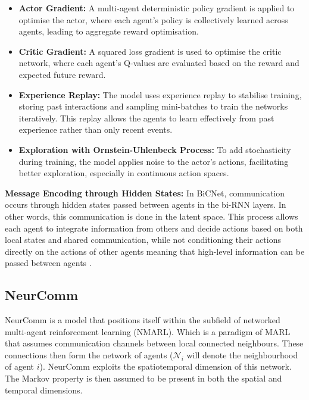 \documentclass{article}
\begin{document}
\begin{itemize}
    \item \textbf{Actor Gradient:} A multi-agent deterministic policy gradient is applied to optimise the actor, where each agent’s policy is collectively learned across agents, leading to aggregate reward optimisation.
    
    \item \textbf{Critic Gradient:} A squared loss gradient is used to optimise the critic network, where each agent’s Q-values are evaluated based on the reward and expected future reward.
    
    \item \textbf{Experience Replay:} The model uses experience replay to stabilise training, storing past interactions and sampling mini-batches to train the networks iteratively. This replay allows the agents to learn effectively from past experience rather than only recent events.
    
    \item \textbf{Exploration with Ornstein-Uhlenbeck Process:} To add stochasticity during training, the model applies noise to the actor's actions, facilitating better exploration, especially in continuous action spaces.
\end{itemize}

\textbf{Message Encoding through Hidden States:} In BiCNet, communication occurs through hidden states passed between agents in the bi-RNN layers. In other words, this communication is done in the latent space. This process allows each agent to integrate information from others and decide actions based on both local states and shared communication, while not conditioning their actions directly on the actions of other agents meaning that high-level information can be passed between agents \citep{peng2017bicnet}.

\subsection{NeurComm}

NeurComm \citep{chu2020NeurComm} is a model that positions itself within the subfield of networked multi-agent reinforcement learning (NMARL). Which is a paradigm of MARL that assumes communication channels between local connected neighbours. These connections then form the network of agents ($\mathcal{N}_i$ will denote the neighbourhood of agent $i$). NeurComm \citep{chu2020NeurComm}  exploits the spatiotemporal dimension of this network. The Markov property is then assumed to be present in both the spatial and temporal dimensions. 
\end{document}
